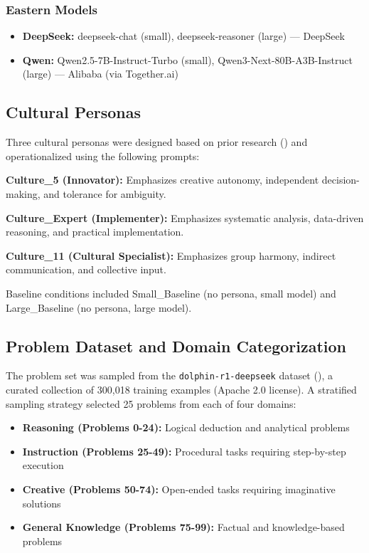 \documentclass{article}
\begin{document}
\subsubsection{Eastern Models}
\begin{itemize}
    \item \textbf{DeepSeek:} deepseek-chat (small), deepseek-reasoner (large) — DeepSeek
    \item \textbf{Qwen:} Qwen2.5-7B-Instruct-Turbo (small), Qwen3-Next-80B-A3B-Instruct (large) — Alibaba (via Together.ai)
\end{itemize}

\subsection{Cultural Personas}

Three cultural personas were designed based on prior research (\cite{haririLLMCreativityMeasuringExplaining2025}) and operationalized using the following prompts:

\textbf{Culture\_5 (Innovator):} Emphasizes creative autonomy, independent decision-making, and tolerance for ambiguity.

\textbf{Culture\_Expert (Implementer):} Emphasizes systematic analysis, data-driven reasoning, and practical implementation.

\textbf{Culture\_11 (Cultural Specialist):} Emphasizes group harmony, indirect communication, and collective input.

Baseline conditions included Small\_Baseline (no persona, small model) and Large\_Baseline (no persona, large model).

\subsection{Problem Dataset and Domain Categorization}

The problem set was sampled from the \texttt{dolphin-r1-deepseek} dataset (\cite{dolphin2024}), a curated collection of 300,018 training examples (Apache 2.0 license). A stratified sampling strategy selected 25 problems from each of four domains:

\begin{itemize}
    \item \textbf{Reasoning (Problems 0-24):} Logical deduction and analytical problems
    \item \textbf{Instruction (Problems 25-49):} Procedural tasks requiring step-by-step execution
    \item \textbf{Creative (Problems 50-74):} Open-ended tasks requiring imaginative solutions
    \item \textbf{General Knowledge (Problems 75-99):} Factual and knowledge-based problems
\end{itemize}
\end{document}
